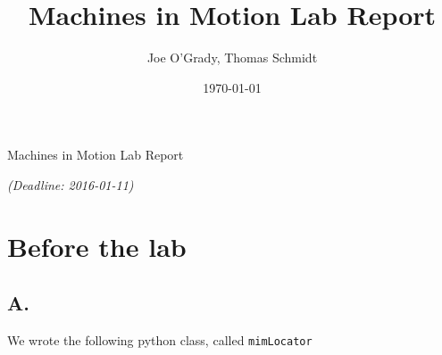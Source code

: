 \documentclass[10pt,a4paper]{scrartcl}
\title{Machines in Motion Lab Report}
\author{Joe O'Grady, Thomas Schmidt}
\date{\today}
\begin{document}
\begin{center}
	\begin{bf}
		\bigskip
		{\LARGE Machines in Motion Lab Report}\\
	\end{bf}
	\textit{\rmfamily(Deadline: 2016-01-11)}
\end{center}

\section{Before the lab}\label{before-the-lab}

\subsection{A.}\label{a.}

We wrote the following python class, called \lstinline!mimLocator!
\end{document}
